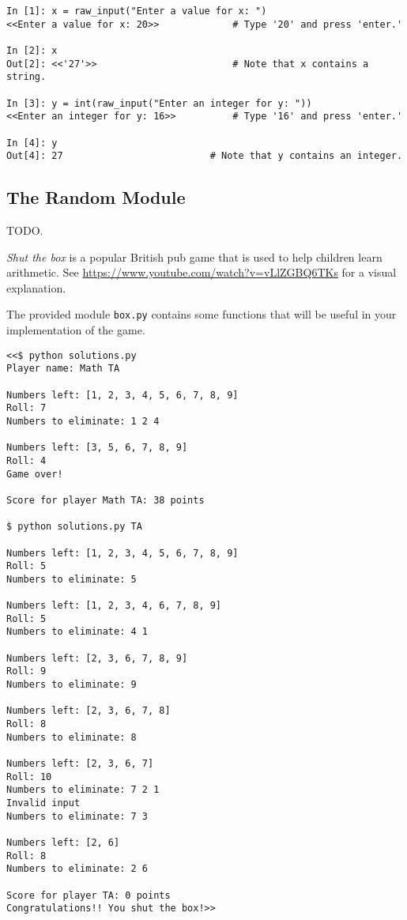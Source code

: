 \begin{lstlisting}
In [1]: x = raw_input("Enter a value for x: ")
<<Enter a value for x: 20>>             # Type '20' and press 'enter.'

In [2]: x
Out[2]: <<'27'>>                        # Note that x contains a string.

In [3]: y = int(raw_input("Enter an integer for y: "))
<<Enter an integer for y: 16>>          # Type '16' and press 'enter.'

In [4]: y
Out[4]: 27                          # Note that y contains an integer.
\end{lstlisting}

\subsection*{The Random Module} %

TODO.


\begin{problem} %
\emph{Shut the box} is a popular British pub game that is used to help children learn arithmetic.
See \url{https://www.youtube.com/watch?v=vLlZGBQ6TKs} for a visual explanation.

The provided module \texttt{box.py} contains some functions that will be useful in your implementation of the game.

\begin{lstlisting}
<<$ python solutions.py
Player name: Math TA

Numbers left: [1, 2, 3, 4, 5, 6, 7, 8, 9]
Roll: 7
Numbers to eliminate: 1 2 4

Numbers left: [3, 5, 6, 7, 8, 9]
Roll: 4
Game over!

Score for player Math TA: 38 points

$ python solutions.py TA

Numbers left: [1, 2, 3, 4, 5, 6, 7, 8, 9]
Roll: 5
Numbers to eliminate: 5

Numbers left: [1, 2, 3, 4, 6, 7, 8, 9]
Roll: 5
Numbers to eliminate: 4 1

Numbers left: [2, 3, 6, 7, 8, 9]
Roll: 9
Numbers to eliminate: 9

Numbers left: [2, 3, 6, 7, 8]
Roll: 8
Numbers to eliminate: 8

Numbers left: [2, 3, 6, 7]
Roll: 10
Numbers to eliminate: 7 2 1
Invalid input
Numbers to eliminate: 7 3

Numbers left: [2, 6]
Roll: 8
Numbers to eliminate: 2 6

Score for player TA: 0 points
Congratulations!! You shut the box!>>
\end{lstlisting}
\end{problem}


